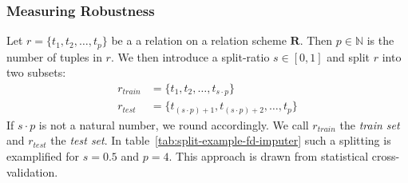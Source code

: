 \subsubsection{Measuring Robustness}
Let \( r = \{ t_1, t_2, \dots, t_p \}\) be a a relation on a relation scheme \( \boldsymbol{R} \).
Then \( p \in \mathbb{N} \) is the number of tuples in \( r \).
We then introduce a split-ratio \( s \in [0, 1] \) and split \( r \) into two subsets:
\begin{align*}
    r_{train} &= \{ t_1, t_2, \dots, t_{s \cdot p} \} \\
    r_{test} &= \{ t_{(s \cdot p) + 1}, t_{(s \cdot p) + 2}, \dots, t_{p} \}
\end{align*}
If \( s \cdot p \) is not a natural number, we round accordingly.
We call \( r_{train} \) the \emph{train set} and \( r_{test} \) the \emph{test set}.
In table~\ref{tab:split-example-fd-imputer} such a splitting is examplified for \( s = 0.5 \) and \( p=4 \).
This approach is drawn from statistical cross-validation.


